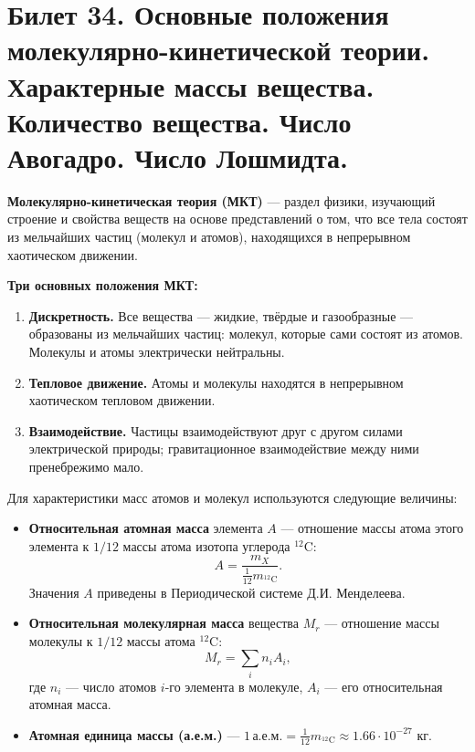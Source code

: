 \section{Билет 34. Основные положения молекулярно-кинетической теории. Характерные массы вещества. Количество вещества. Число Авогадро. Число Лошмидта.}

\begin{definition}
\textbf{Молекулярно-кинетическая теория (МКТ)} --- раздел физики, изучающий строение и свойства веществ на основе представлений о том, что все тела состоят из мельчайших частиц (молекул и атомов), находящихся в непрерывном хаотическом движении.
\par\noindent\textbf{Три основных положения МКТ:}
\begin{enumerate}
	\item \textbf{Дискретность. }Все вещества --- жидкие, твёрдые и газообразные --- образованы из мельчайших частиц: молекул, которые сами состоят из атомов. Молекулы и атомы электрически нейтральны.
	\item \textbf{Тепловое движение. }Атомы и молекулы находятся в непрерывном хаотическом тепловом движении.
	\item \textbf{Взаимодействие. }Частицы взаимодействуют друг с другом силами электрической природы; гравитационное взаимодействие между ними пренебрежимо мало.
\end{enumerate}
\end{definition}

\begin{definition}
Для характеристики масс атомов и молекул используются следующие величины:
\begin{itemize}
    \item \textbf{Относительная атомная масса} элемента $A$ --- отношение массы атома этого элемента к $1/12$ массы атома изотопа углерода $^{12}\text{C}$:
    \begin{equation}
        A = \frac{m_X}{\frac{1}{12} m_{^{12}\text{C}}}.
    \end{equation}
    Значения $A$ приведены в Периодической системе Д.И. Менделеева.
    \item \textbf{Относительная молекулярная масса} вещества $M_r$ --- отношение массы молекулы к $1/12$ массы атома $^{12}\text{C}$:
    \begin{equation}
        M_r = \sum_i n_i A_i,
    \end{equation}
    где $n_i$ --- число атомов $i$-го элемента в молекуле, $A_i$ --- его относительная атомная масса.
    \item \textbf{Атомная единица массы (а.е.м.)} --- $1\,\text{а.е.м.} = \frac{1}{12} m_{^{12}\text{C}} \approx 1.66 \cdot 10^{-27}$ кг.
\end{itemize}
\end{definition}

